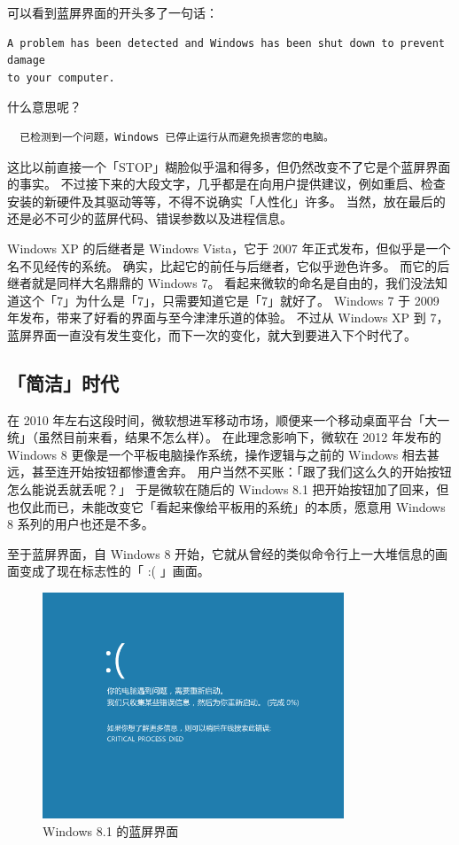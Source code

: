 可以看到蓝屏界面的开头多了一句话：

\begin{Verbatim}
A problem has been detected and Windows has been shut down to prevent damage
to your computer.
\end{Verbatim}

什么意思呢？

\begin{Verbatim}
  已检测到一个问题，Windows 已停止运行从而避免损害您的电脑。
\end{Verbatim}

这比以前直接一个「STOP」糊脸似乎温和得多，但仍然改变不了它是个蓝屏界面的事实。
不过接下来的大段文字，几乎都是在向用户提供建议，例如重启、检查安装的新硬件及其驱动等等，不得不说确实「人性化」许多。
当然，放在最后的还是必不可少的蓝屏代码、错误参数以及进程信息。

Windows XP 的后继者是 Windows Vista，它于 2007 年正式发布，但似乎是一个名不见经传的系统。
确实，比起它的前任与后继者，它似乎逊色许多。
而它的后继者就是同样大名鼎鼎的 Windows 7。
看起来微软的命名是自由的，我们没法知道这个「7」为什么是「7」，只需要知道它是「7」就好了。
Windows 7 于 2009 年发布，带来了好看的界面与至今津津乐道的体验。
不过从 Windows XP 到 7，蓝屏界面一直没有发生变化，而下一次的变化，就大到要进入下个时代了。

\subsection{「简洁」时代}

在 2010 年左右这段时间，微软想进军移动市场，顺便来一个移动桌面平台「大一统」（虽然目前来看，结果不怎么样）。
在此理念影响下，微软在 2012 年发布的 Windows 8 更像是一个平板电脑操作系统，操作逻辑与之前的 Windows 相去甚远，甚至连开始按钮都惨遭舍弃。
用户当然不买账：「跟了我们这么久的开始按钮怎么能说丢就丢呢？」
于是微软在随后的 Windows 8.1 把开始按钮加了回来，但也仅此而已，未能改变它「看起来像给平板用的系统」的本质，愿意用 Windows 8 系列的用户也还是不多。

至于蓝屏界面，自 Windows 8 开始，它就从曾经的类似命令行上一大堆信息的画面变成了现在标志性的「 :( 」画面。

\begin{figure}[htb!]
  \centering
  \includegraphics[width=9cm]{assets/Win-8.1-BSoD.png}
  \caption{Windows 8.1 的蓝屏界面}
  \label{Win-8.1-BSoD}
\end{figure}

